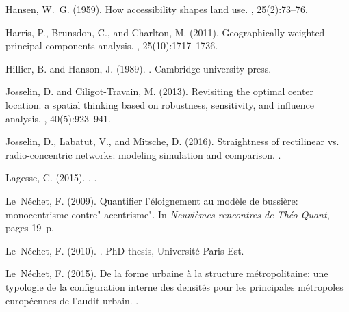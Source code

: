 \documentclass[11pt]{article}
\begin{document}
\begin{multicols}{2}
\begin{thebibliography}{}
Hansen, W.~G. (1959).
\newblock How accessibility shapes land use.
, 25(2):73--76.

Harris, P., Brunsdon, C., and Charlton, M. (2011).
\newblock Geographically weighted principal components analysis.
,
  25(10):1717--1736.

Hillier, B. and Hanson, J. (1989).
.
\newblock Cambridge university press.

Josselin, D. and Ciligot-Travain, M. (2013).
\newblock Revisiting the optimal center location. a spatial thinking based on
  robustness, sensitivity, and influence analysis.
,
  40(5):923--941.

Josselin, D., Labatut, V., and Mitsche, D. (2016).
\newblock Straightness of rectilinear vs. radio-concentric networks: modeling
  simulation and comparison.
.

{Lagesse}, C. (2015).
.
.

Le~N{\'e}chet, F. (2009).
\newblock Quantifier l'{\'e}loignement au mod{\`e}le de bussi{\`e}re:
  monocentrisme contre" acentrisme".
\newblock In {\em Neuvi{\`e}mes rencontres de Th{\'e}o Quant}, pages 19--p.

Le~N{\'e}chet, F. (2010).
.
\newblock PhD thesis, Universit{\'e} Paris-Est.

Le~N{\'e}chet, F. (2015).
\newblock De la forme urbaine {\`a} la structure m{\'e}tropolitaine: une
  typologie de la configuration interne des densit{\'e}s pour les principales
  m{\'e}tropoles europ{\'e}ennes de l'audit urbain.
.


\end{thebibliography}
\end{multicols}
\end{document}
